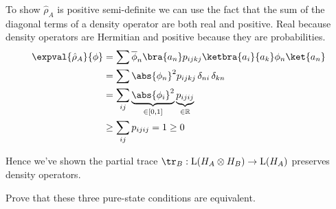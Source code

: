 \documentclass[
	pages,
	boxes,
	color=RoyalPurple
]{homework}
\makeatletter
\numberwithin{tcb@cnt@prob}{section}
\makeatother
\begin{document}
\begin{solution}
    To show $\hat{\rho}_A$ is positive semi-definite we can use the fact that the sum of the diagonal terms of a density operator are both real and positive. Real because density operators are Hermitian and positive because they are probabilities.
    \begin{align*}
        \expval{\hat{\rho}_A}{\phi} & = \sum \overline{\phi}_n \bra{a_n}p_{ijkj}\ketbra{a_i}{a_k}\phi_n\ket{a_n}      \\
                                    & = \sum\abs{\phi_n}^2 p_{ijkj}\,\delta_{ni}\,\delta_{kn}                         \\
                                    & = \sum_{ij}\underbrace{\abs{\phi_i}^2}_{\in[0,1]} \underbrace{p_{ijij}}_{\in\R} \\
                                    & \geq \sum_{ij}p_{ijij} = 1 \geq 0
    \end{align*}

    Hence we've shown the partial trace $\tr_B:\mathrm{L}(H_A\otimes H_B)\to \mathrm{L}(H_A)$ preserves density operators.
\end{solution}

\begin{problem}
Prove that these three pure-state conditions are equivalent.
\end{problem}
\end{document}
